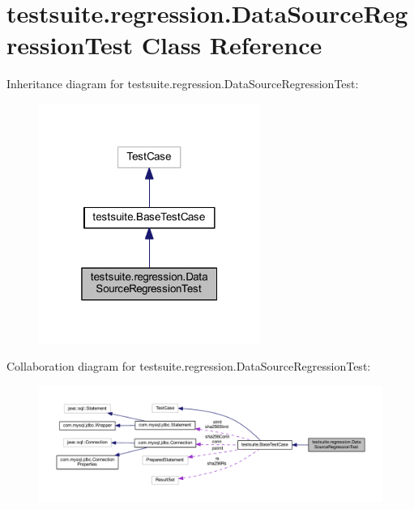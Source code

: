 \hypertarget{classtestsuite_1_1regression_1_1_data_source_regression_test}{}\section{testsuite.\+regression.\+Data\+Source\+Regression\+Test Class Reference}
\label{classtestsuite_1_1regression_1_1_data_source_regression_test}


Inheritance diagram for testsuite.\+regression.\+Data\+Source\+Regression\+Test\+:
\nopagebreak
\begin{figure}[H]
\begin{center}
\leavevmode
\includegraphics[width=205pt]{classtestsuite_1_1regression_1_1_data_source_regression_test__inherit__graph}
\end{center}
\end{figure}


Collaboration diagram for testsuite.\+regression.\+Data\+Source\+Regression\+Test\+:
\nopagebreak
\begin{figure}[H]
\begin{center}
\leavevmode
\includegraphics[width=350pt]{classtestsuite_1_1regression_1_1_data_source_regression_test__coll__graph}
\end{center}
\end{figure}
